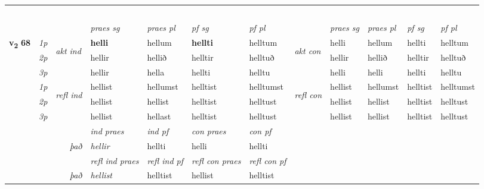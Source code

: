 \begin{longtable}[l]{X>{\footnotesize\itshape}llXXXXlXXXX}
\midrule
& \\*
   & \\*
  & \\*
   & \\*
  & \\
   \midrule
 & &   & \textit{praes sg}  & \textit{praes pl}    & \textit{ pf sg} & \textit{pf pl} & & \textit{praes sg}  & \textit{praes pl}    & \textit{pf sg} & \textit{pf pl }  \\ \cmidrule{4-7} \cmidrule{9-12}
 \multirow{2}{*}{{{\textbf{v{\textsubscript{2}}} \Large{\textbf{68}}}}}  & 1p & \multirow{3}{*}{\begin{turn}{90}\textit{akt ind}\end{turn}} & \textbf{helli} & hellum & \textbf{hellti} & helltum & \multirow{3}{*}{\begin{turn}{90}\textit{akt con}\end{turn}} &helli & hellum & hellti & helltum\\*
 & 2p &  &  hellir  & hellið & helltir & helltuð & & hellir & hellið & helltir & helltuð \\*
 & 3p &  & hellir & hella & hellti & helltu & & helli & helli& hellti & helltu \\*
\cmidrule{4-7} \cmidrule{9-12}
 & 1p & \multirow{3}{*}{\begin{turn}{90}\textit{refl ind}\end{turn}}  & hellist & hellumst & helltist & helltumst & \multirow{3}{*}{\begin{turn}{90}\textit{refl con}\end{turn}}  &hellist & hellumst & helltist & helltumst \\*
 & 2p &  & hellist & hellist & helltist & helltust & &hellist & hellist & helltist & helltust \\*
 & 3p  & & hellist & hellast & helltist & helltust & & hellist & hellist& helltist & helltust \\*
\cmidrule{4-7} \cmidrule{9-12}

   && &  \textit{ind praes} & \textit{ind pf} & \textit{con praes} & \textit{con pf} \\*
\multicolumn{3}{r}{\textit{það}} & hellir & hellti & helli & hellti \\*

\cmidrule{4-7}
 & && \textit{refl ind praes} & \textit{refl ind pf} & \textit{refl con praes} & \textit{refl con pf} \\*
\multicolumn{3}{r}{\textit{það}}& hellist & helltist & hellist & helltist \\*


\end{longtable}
